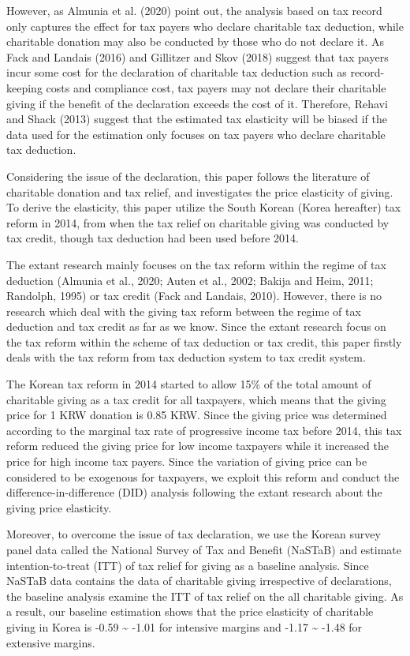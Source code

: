 \documentclass[
  11pt,
  a4paper,
]{article}
\begin{document}
However, as Almunia et al. (2020) point out, the analysis based on tax record only captures the effect for tax payers who declare charitable tax deduction, while charitable donation may also be conducted by those who do not declare it. As Fack and Landais (2016) and Gillitzer and Skov (2018) suggest that tax payers incur some cost for the declaration of charitable tax deduction such as record-keeping costs and compliance cost, tax payers may not declare their charitable giving if the benefit of the declaration exceeds the cost of it. Therefore, Rehavi and Shack (2013) suggest that the estimated tax elasticity will be biased if the data used for the estimation only focuses on tax payers who declare charitable tax deduction.

Considering the issue of the declaration, this paper follows the literature of charitable donation and tax relief, and investigates the price elasticity of giving. To derive the elasticity, this paper utilize the South Korean (Korea hereafter) tax reform in 2014, from when the tax relief on charitable giving was conducted by tax credit, though tax deduction had been used before 2014.

The extant research mainly focuses on the tax reform within the regime of tax deduction (Almunia et al., 2020; Auten et al., 2002; Bakija and Heim, 2011; Randolph, 1995) or tax credit (Fack and Landais, 2010). However, there is no research which deal with the giving tax reform between the regime of tax deduction and tax credit as far as we know. Since the extant research focus on the tax reform within the scheme of tax deduction or tax credit, this paper firstly deals with the tax reform from tax deduction system to tax credit system.

The Korean tax reform in 2014 started to allow 15\% of the total amount of charitable giving as a tax credit for all taxpayers, which means that the giving price for 1 KRW donation is 0.85 KRW. Since the giving price was determined according to the marginal tax rate of progressive income tax before 2014, this tax reform reduced the giving price for low income taxpayers while it increased the price for high income tax payers. Since the variation of giving price can be considered to be exogenous for taxpayers, we exploit this reform and conduct the difference-in-difference (DID) analysis following the extant research about the giving price elasticity.

Moreover, to overcome the issue of tax declaration, we use the Korean survey panel data called the National Survey of Tax and Benefit (NaSTaB) and estimate intention-to-treat (ITT) of tax relief for giving as a baseline analysis. Since NaSTaB data contains the data of charitable giving irrespective of declarations, the baseline analysis examine the ITT of tax relief on the all charitable giving.
As a result, our baseline estimation shows that the price elasticity of charitable giving in Korea is -0.59 \textasciitilde{} -1.01 for intensive margins and -1.17 \textasciitilde{} -1.48 for extensive margins.
\end{document}
